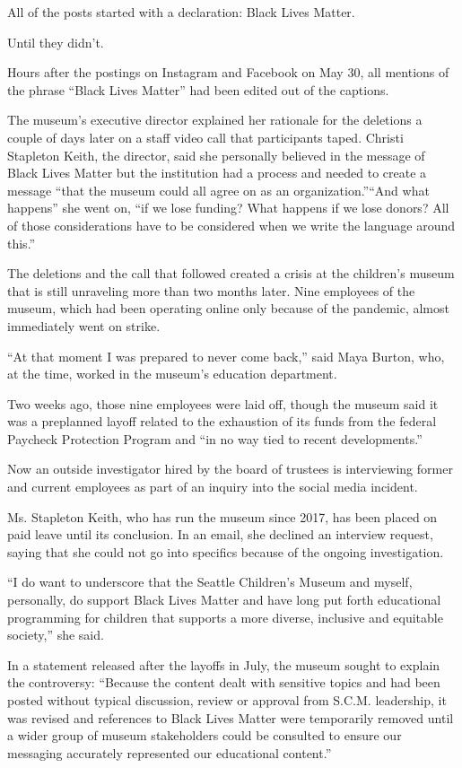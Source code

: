 All of the posts started with a declaration: Black Lives Matter.

Until they didn't.

Hours after the postings on Instagram and Facebook on May 30, all
mentions of the phrase ``Black Lives Matter'' had been edited out of the
captions.

The museum's executive director explained her rationale for the
deletions a couple of days later on a staff video call that participants
taped. Christi Stapleton Keith, the director, said she personally
believed in the message of Black Lives Matter but the institution had a
process and needed to create a message ``that the museum could all agree
on as an organization.''``And what happens'' she went on, ``if we lose
funding? What happens if we lose donors? All of those considerations
have to be considered when we write the language around this.''

The deletions and the call that followed created a crisis at the
children's museum that is still unraveling more than two months later.
Nine employees of the museum, which had been operating online only
because of the pandemic, almost immediately went on strike.

``At that moment I was prepared to never come back,'' said Maya Burton,
who, at the time, worked in the museum's education department.

Two weeks ago, those nine employees were laid off, though the museum
said it was a preplanned layoff related to the exhaustion of its funds
from the federal Paycheck Protection Program and ``in no way tied to
recent developments.''

Now an outside investigator hired by the board of trustees is
interviewing former and current employees as part of an inquiry into the
social media incident.

Ms. Stapleton Keith, who has run the museum since 2017, has been placed
on paid leave until its conclusion. In an email, she declined an
interview request, saying that she could not go into specifics because
of the ongoing investigation.

``I do want to underscore that the Seattle Children's Museum and myself,
personally, do support Black Lives Matter and have long put forth
educational programming for children that supports a more diverse,
inclusive and equitable society,'' she said.

In a statement released after the layoffs in July, the museum sought to
explain the controversy: ``Because the content dealt with sensitive
topics and had been posted without typical discussion, review or
approval from S.C.M. leadership, it was revised and references to Black
Lives Matter were temporarily removed until a wider group of museum
stakeholders could be consulted to ensure our messaging accurately
represented our educational content.''

